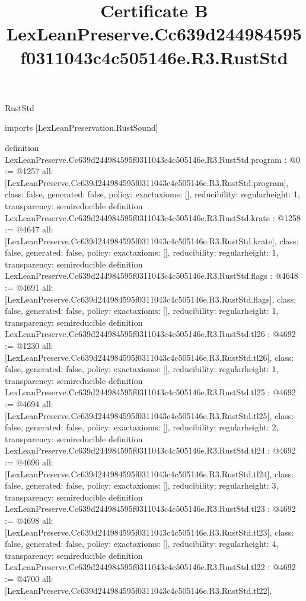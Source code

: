 \begin{lexlean}{RustStd}
\title{Certificate B LexLeanPreserve.Cc639d244984595f0311043c4c505146e.R3.RustStd}
\begin{coremodule}
imports [LexLeanPreservation.RustSound]

definition LexLeanPreserve.Cc639d244984595f0311043c4c505146e.R3.RustStd.program : @0 := @1257 {
  all: [LexLeanPreserve.Cc639d244984595f0311043c4c505146e.R3.RustStd.program],
  class: false,
  generated: false,
  policy: exact{axioms: []},
  reducibility: regular{height: 1},
  transparency: semireducible
}
definition LexLeanPreserve.Cc639d244984595f0311043c4c505146e.R3.RustStd.krate : @1258 := @4647 {
  all: [LexLeanPreserve.Cc639d244984595f0311043c4c505146e.R3.RustStd.krate],
  class: false,
  generated: false,
  policy: exact{axioms: []},
  reducibility: regular{height: 1},
  transparency: semireducible
}
definition LexLeanPreserve.Cc639d244984595f0311043c4c505146e.R3.RustStd.flags : @4648 := @4691 {
  all: [LexLeanPreserve.Cc639d244984595f0311043c4c505146e.R3.RustStd.flags],
  class: false,
  generated: false,
  policy: exact{axioms: []},
  reducibility: regular{height: 1},
  transparency: semireducible
}
definition LexLeanPreserve.Cc639d244984595f0311043c4c505146e.R3.RustStd.tl26 : @4692 := @1230 {
  all: [LexLeanPreserve.Cc639d244984595f0311043c4c505146e.R3.RustStd.tl26],
  class: false,
  generated: false,
  policy: exact{axioms: []},
  reducibility: regular{height: 1},
  transparency: semireducible
}
definition LexLeanPreserve.Cc639d244984595f0311043c4c505146e.R3.RustStd.tl25 : @4692 := @4694 {
  all: [LexLeanPreserve.Cc639d244984595f0311043c4c505146e.R3.RustStd.tl25],
  class: false,
  generated: false,
  policy: exact{axioms: []},
  reducibility: regular{height: 2},
  transparency: semireducible
}
definition LexLeanPreserve.Cc639d244984595f0311043c4c505146e.R3.RustStd.tl24 : @4692 := @4696 {
  all: [LexLeanPreserve.Cc639d244984595f0311043c4c505146e.R3.RustStd.tl24],
  class: false,
  generated: false,
  policy: exact{axioms: []},
  reducibility: regular{height: 3},
  transparency: semireducible
}
definition LexLeanPreserve.Cc639d244984595f0311043c4c505146e.R3.RustStd.tl23 : @4692 := @4698 {
  all: [LexLeanPreserve.Cc639d244984595f0311043c4c505146e.R3.RustStd.tl23],
  class: false,
  generated: false,
  policy: exact{axioms: []},
  reducibility: regular{height: 4},
  transparency: semireducible
}
definition LexLeanPreserve.Cc639d244984595f0311043c4c505146e.R3.RustStd.tl22 : @4692 := @4700 {
  all: [LexLeanPreserve.Cc639d244984595f0311043c4c505146e.R3.RustStd.tl22],
}
\end{coremodule}
\end{lexlean}
